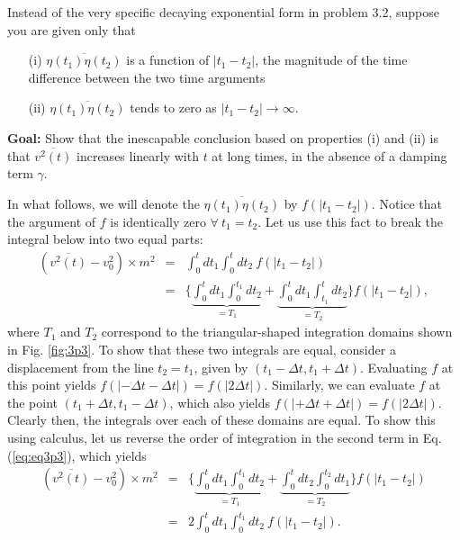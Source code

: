 
Instead of the very specific decaying exponential form in problem 3.2, suppose you are given only that
\begin{itemize}
\item[(i)] $\overline{\eta(t_1) \eta(t_2)}$ is a function of $|t_1-t_2|$, the magnitude of the 
time difference between the two time arguments
\item[(ii)] $\overline{\eta(t_1) \eta(t_2)}$ tends to zero as $|t_1-t_2|\rightarrow\infty$.
\end{itemize}
\textbf{Goal:} Show that the inescapable conclusion based on properties (i) and (ii) is that $\overline{v^2(t)}$ increases linearly with $t$ at long times, in the absence of a damping term $\gamma$.

In what follows, we will denote the $\overline{\eta(t_1) \eta(t_2)}$ by $f(|t_1-t_2|)$. Notice that the argument of $f$ is identically zero $\forall~t_1=t_2$. Let us use this fact to break the integral below into two equal parts:
\begin{eqnarray}
(\overline{v^2(t)}-v_0^2) \times m^2 &=& \int_{0}^{t} dt_1 \int_{0}^{t} dt_2 ~ f(|t_1-t_2|) \nonumber \\
&=& \bigg\{\underbrace{\int_{0}^{t} dt_1 \int_{0}^{t_1} dt_2}_{=T_1} + \underbrace{\int_{0}^{t} dt_1 \int_{t_1}^{t} dt_2}_{=T_2} \bigg\} f(|t_1-t_2|)\label{eq:eq3p3},
\end{eqnarray}
where $T_1$ and $T_2$ correspond to the triangular-shaped integration domains shown in Fig. \ref{fig:3p3}. To show that these two integrals are equal, consider a displacement from the line $t_2=t_1$, given by $(t_1-\Delta t, t_1+\Delta t)$. Evaluating $f$ at this point yields $f(|-\Delta t-\Delta t|)=f(|2\Delta t|)$. Similarly, we can evaluate $f$ at the point $(t_1+\Delta t, t_1-\Delta t)$, which also yields $f(|+\Delta t+\Delta t|)=f(|2\Delta t|)$. Clearly then, the integrals over each of these domains are equal. To show this using calculus, let us reverse the order of integration in the second term in Eq. (\ref{eq:eq3p3}), which yields
\begin{eqnarray}
(\overline{v^2(t)}-v_0^2) \times m^2
&=& \bigg\{\underbrace{\int_{0}^{t} dt_1 \int_{0}^{t_1} dt_2}_{=T_1} + \underbrace{\int_{0}^{t} dt_2 \int_{0}^{t_2} dt_1}_{=T_2} \bigg\} f(|t_1-t_2|)  \nonumber \\
&=& 2 \int_{0}^{t} dt_1 \int_{0}^{t_1} dt_2 ~f(|t_1-t_2|).  \nonumber \\
\end{eqnarray}
